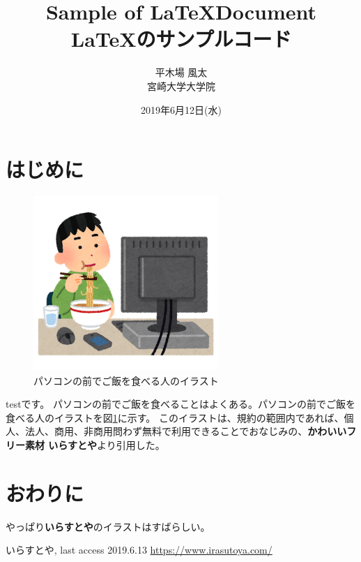 \documentclass[uplatex, twocolumn,10pt]{jsarticle}
\begin{document}
\title{\bf{\LARGE{Sample of \LaTeX  Document} \\ \Large{\LaTeX のサンプルコード}}}
\author{平木場 風太\\宮崎大学大学院}
\date{2019年6月12日(水)}
\maketitle


\section{はじめに}
\begin{figure}[t]
    \begin{center}
        \includegraphics[width=7cm]{image/syokuji_computer.png}
        \caption{パソコンの前でご飯を食べる人のイラスト}
        \label{fig:syokuji_computer}
    \end{center}
\end{figure}

testです。
パソコンの前でご飯を食べることはよくある。パソコンの前でご飯を食べる人のイラストを図\ref{fig:syokuji_computer}に示す。
このイラストは、規約の範囲内であれば、個人、法人、商用、非商用問わず無料で利用できることでおなじみの、{\bf かわいいフリー素材 いらすとや}\cite{irasutoya}より引用した。

\section{おわりに}
やっぱり{\bf いらすとや}のイラストはすばらしい。

\begin{thebibliography}{99}
     いらすとや, last access 2019.6.13 \url{https://www.irasutoya.com/}



\end{thebibliography}
\end{document}
